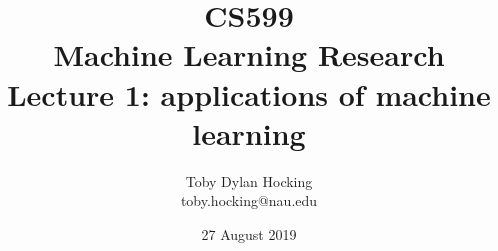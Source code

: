 \documentclass{beamer}
\begin{document}
\title{CS599\\Machine Learning Research
\\Lecture 1: applications of machine learning}
  \date{27 August 2019}
\author{
  Toby Dylan Hocking\\
  toby.hocking@nau.edu
}


\maketitle


\end{document}
